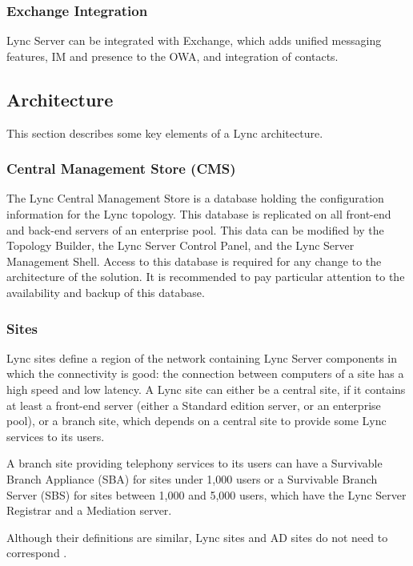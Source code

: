\subsubsection{Exchange Integration}
Lync Server can be integrated with Exchange, which adds unified messaging features, IM and presence to the OWA, and integration of contacts. 


\subsection{Architecture}
This section describes some key elements of a Lync architecture.

\subsubsection{Central Management Store (CMS)}

The Lync Central Management Store is a database holding the configuration information for the Lync topology. This database is replicated on all front-end and back-end servers of an enterprise pool. This data can be modified by the Topology Builder, the Lync Server Control Panel, and the Lync Server Management Shell. Access to this database is required for any change to the architecture of the solution. It is recommended to pay particular attention to the availability and backup of this database.


\subsubsection{Sites}

Lync sites define a region of the network containing Lync Server components in which the connectivity is good: the connection between computers of a site has a high speed and low latency. A Lync site can either be a central site, if it contains at least a front-end server (either a Standard edition server, or an enterprise pool), or a branch site, which depends on a central site to provide some Lync services to its users.

A branch site providing telephony services to its users can have a Survivable Branch Appliance (SBA) for sites under 1,000 users or a Survivable Branch Server (SBS) for sites between 1,000 and 5,000 users, which have the Lync Server Registrar and a Mediation server. 

Although their definitions are similar, Lync sites and AD sites do not need to correspond
\cite{microsoft_technet_sites_2012}.


